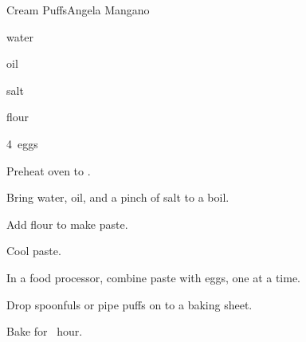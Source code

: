 \begin{recipe}{Cream Puffs}{Angela Mangano}{}

\begin{ingredients}
\item {} water
\item \C{\half} oil
\item salt
\item {} flour 
\item 4~eggs
\end{ingredients}

\begin{directions}
\item Preheat oven to .
\item Bring water, oil, and a pinch of salt to a boil.
\item Add flour to make paste.
\item Cool paste.
\item In a food processor, combine paste with eggs, one at a time.
\item Drop spoonfuls or pipe puffs on to a baking sheet.
\item Bake for \half~hour.
\end{directions}

\end{recipe}

